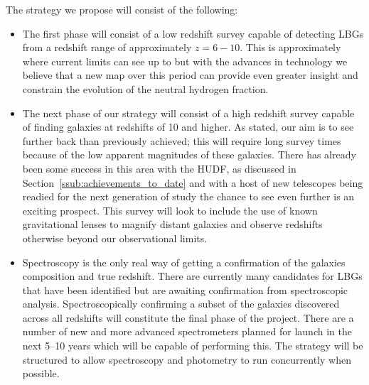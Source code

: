 	The strategy we propose will consist of the following:
	\begin{itemize}
		\item The first phase will consist of a low redshift survey capable of detecting LBGs from a redshift range of approximately $z=6-10$. This is approximately where current limits can see up to but with the advances in technology we believe that a new map over this period can provide even greater insight and constrain the evolution of the neutral hydrogen fraction.
		\item The next phase of our strategy will consist of a high redshift survey capable of finding galaxies at redshifts of 10 and higher. As stated, our aim is to see further back than previously achieved; this will require long survey times because of the low apparent magnitudes of these galaxies. There has already been some success in this area with the HUDF, as discussed in Section~\ref{ssub:achievements_to_date} and with a host of new telescopes being readied for the next generation of study the chance to see even further is an exciting prospect. This survey will look to include the use of known gravitational lenses to magnify distant galaxies and observe redshifts otherwise beyond our observational limits.
		\item Spectroscopy is the only real way of getting a confirmation of the galaxies composition and true redshift. There are currently many candidates for LBGs that have been identified but are awaiting confirmation from spectroscopic analysis. Spectroscopically confirming a subset of the galaxies discovered across all redshifts will constitute the final phase of the project. There are a number of new and more advanced spectrometers planned for launch in the next 5--10 years which will be capable of performing this. The strategy will be structured to allow spectroscopy and photometry to run concurrently when possible.
	\end{itemize}

